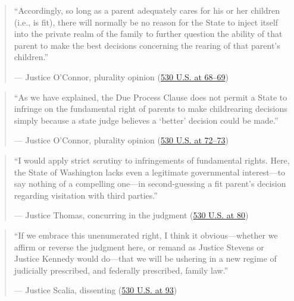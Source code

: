 \documentclass[12pt]{article}
\begin{document}
\begin{quote}
``Accordingly, so long as a parent adequately cares for his or her children (i.e., is fit), there will normally be no reason for the State to inject itself into the private realm of the family to further question the ability of that parent to make the best decisions concerning the rearing of that parent's children.''
\begin{flushright}--- Justice O'Connor, plurality opinion (\href{https://www.law.cornell.edu/supremecourt/text/99-138}{530 U.S. at 68--69})\end{flushright}
\end{quote}

\begin{quote}
``As we have explained, the Due Process Clause does not permit a State to infringe on the fundamental right of parents to make childrearing decisions simply because a state judge believes a `better' decision could be made.''
\begin{flushright}--- Justice O'Connor, plurality opinion (\href{https://www.law.cornell.edu/supremecourt/text/99-138}{530 U.S. at 72--73})\end{flushright}
\end{quote}

\begin{quote}
``I would apply strict scrutiny to infringements of fundamental rights. Here, the State of Washington lacks even a legitimate governmental interest---to say nothing of a compelling one---in second-guessing a fit parent's decision regarding visitation with third parties.''
\begin{flushright}--- Justice Thomas, concurring in the judgment (\href{https://www.law.cornell.edu/supremecourt/text/99-138}{530 U.S. at 80})\end{flushright}
\end{quote}

\begin{quote}
``If we embrace this unenumerated right, I think it obvious---whether we affirm or reverse the judgment here, or remand as Justice Stevens or Justice Kennedy would do---that we will be ushering in a new regime of judicially prescribed, and federally prescribed, family law.''
\begin{flushright}--- Justice Scalia, dissenting (\href{https://www.law.cornell.edu/supremecourt/text/99-138}{530 U.S. at 93})\end{flushright}
\end{quote}
\end{document}
